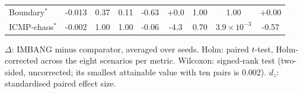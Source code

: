 \begin{table}[!htbp]
{\begin{tabular}{@{}lcccccccc@{}}
Boundary$^\ast$ & -0.013 & 0.37 & 0.11 & -0.63 & +0.0 & 1.00 & 1.00 & +0.00 \\
ICMP-chaos$^\ast$ & -0.002 & 1.00 & 1.00 & -0.06 & -4.3 & 0.70 & $3.9\times10^{-3}$ & -0.57 \\
\bottomrule
\end{tabular}}
\vspace{2pt}
\parbox{\textwidth}{\footnotesize $\Delta$: IMBANG minus comparator, averaged over seeds. Holm: paired $t$-test, Holm-corrected across the eight scenarios per metric. Wilcoxon: signed-rank test (two-sided, uncorrected; its smallest attainable value with ten pairs is 0.002). $d_z$: standardised paired effect size.}
\end{table}

